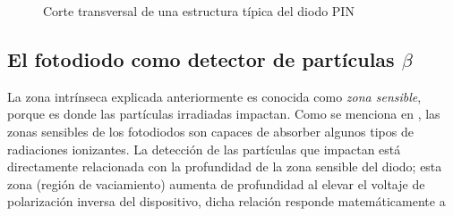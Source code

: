 \documentclass[a4paper,conference]{IEEEtran}
\begin{document}
       \begin{figure}[!b]
           \centering
           \caption{Corte transversal de una estructura típica del diodo PIN}
           \label{fig:pin}
       \end{figure}
    \subsection{El fotodiodo como detector de partículas $\beta$}
        La zona intrínseca explicada anteriormente es conocida como \emph{zona
        sensible}, porque es donde las partículas irradiadas impactan. Como se
        menciona en \cite{mpdi}, las zonas sensibles de los fotodiodos son
        capaces de absorber algunos tipos de radiaciones ionizantes. La
        detección de las partículas que impactan está directamente relacionada
        con la profundidad de la zona sensible del diodo; esta zona (región de
        vaciamiento) aumenta de profundidad al elevar el voltaje de polarización
        inversa del dispositivo, dicha relación responde matemáticamente a
\end{document}
